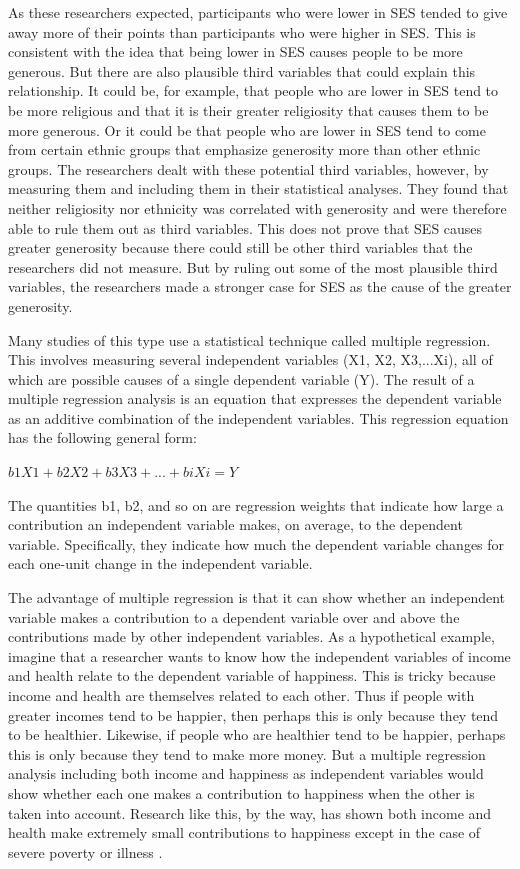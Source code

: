 As these researchers expected, participants who were lower in SES tended to give away more of their points than participants who were higher in SES. This is consistent with the idea that being lower in SES causes people to be more generous. But there are also plausible third variables that could explain this relationship. It could be, for example, that people who are lower in SES tend to be more religious and that it is their greater religiosity that causes them to be more generous. Or it could be that people who are lower in SES tend to come from certain ethnic groups that emphasize generosity more than other ethnic groups. The researchers dealt with these potential third variables, however, by measuring them and including them in their statistical analyses. They found that neither religiosity nor ethnicity was correlated with generosity and were therefore able to rule them out as third variables. This does not prove that SES causes greater generosity because there could still be other third variables that the researchers did not measure. But by ruling out some of the most plausible third variables, the researchers made a stronger case for SES as the cause of the greater generosity.

Many studies of this type use a statistical technique called multiple regression. This involves measuring several independent variables (X1, X2, X3,...Xi), all of which are possible causes of a single dependent variable (Y). The result of a multiple regression analysis is an equation that expresses the dependent variable as an additive combination of the independent variables. This regression equation has the following general form:

$b1X1+ b2X2+ b3X3+ ... + biXi = Y$

The quantities b1, b2, and so on are regression weights that indicate how large a contribution an independent variable makes, on average, to the dependent variable. Specifically, they indicate how much the dependent variable changes for each one-unit change in the independent variable.

The advantage of multiple regression is that it can show whether an independent variable makes a contribution to a dependent variable over and above the contributions made by other independent variables. As a hypothetical example, imagine that a researcher wants to know how the independent variables of income and health relate to the dependent variable of happiness. This is tricky because income and health are themselves related to each other. Thus if people with greater incomes tend to be happier, then perhaps this is only because they tend to be healthier. Likewise, if people who are healthier tend to be happier, perhaps this is only because they tend to make more money. But a multiple regression analysis including both income and happiness as independent variables would show whether each one makes a contribution to happiness when the other is taken into account. Research like this, by the way, has shown both income and health make extremely small contributions to happiness except in the case of severe poverty or illness \cite{diener_subjective_2000}.

